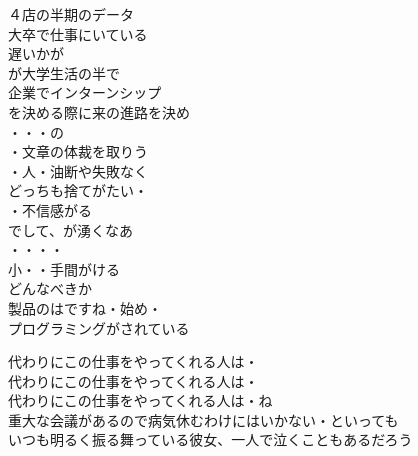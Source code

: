 \begin{multicols}{2}
４店の半期のデータ\\
大卒で仕事にいている\\
遅いかが\\
が大学生活の半で\\
企業でインターンシップ\\
を決める際に来の進路を決め\\

・・・の\\
・文章の体裁を取りう\\

・人・油断や失敗なく\\
どっちも捨てがたい・\\
・不信感がる\\
でして、が湧くなあ\\

・・・・\\
小・・手間がける\\
どんなべきか\\
製品のはですね・始め・\\
プログラミングがされている\\

\end{multicols}

代わりにこの仕事をやってくれる人は・\\
代わりにこの仕事をやってくれる人は・\\
代わりにこの仕事をやってくれる人は・ね\\
重大な会議があるので病気休むわけにはいかない・といっても\\
いつも明るく振る舞っている彼女、一人で泣くこともあるだろう\\

